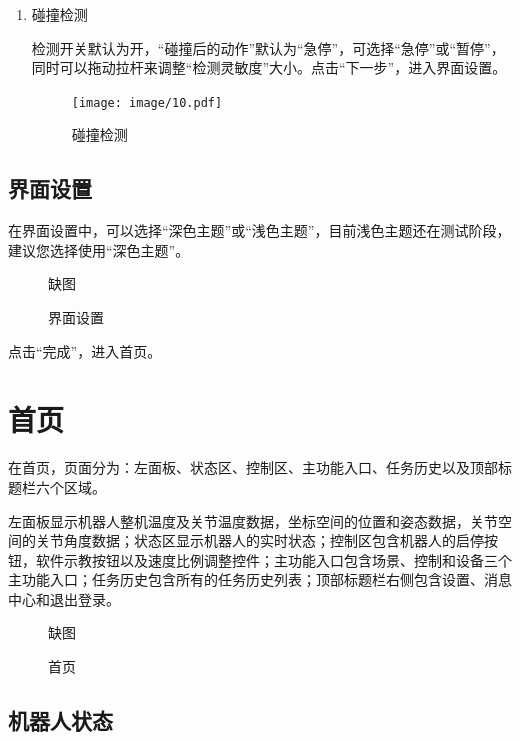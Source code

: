 \begin{enumerate}
\item 碰撞检测

	检测开关默认为开，“碰撞后的动作”默认为“急停”，可选择“急停”或“暂停”，同时可以拖动拉杆来调整“检测灵敏度”大小。点击“下一步”，进入界面设置。

	\begin{figure}[ht]
		\centering
		\texttt{[image: image/10.pdf]}
		\caption{碰撞检测}
		\label{fig:碰撞检测}
	\end{figure}


\end{enumerate}
	
\subsection{界面设置}

在界面设置中，可以选择“深色主题”或“浅色主题”，目前\LM 浅色主题还在测试阶段，建议您选择使用“深色主题”。

\begin{figure}[ht]
	\centering
	\color{red}缺图
	\caption{界面设置}
	\label{fig:界面设置}
\end{figure}

点击“完成”，进入\LM 首页。

\section{首页}

在\LM 首页，页面分为：左面板、状态区、控制区、主功能入口、任务历史以及顶部标题栏六个区域。

左面板显示机器人整机温度及关节温度数据，坐标空间的位置和姿态数据，关节空间的关节角度数据；状态区显示机器人的实时状态；控制区包含机器人的启停按钮，软件示教按钮以及速度比例调整控件；主功能入口包含场景、控制和设备三个主功能入口；任务历史包含所有的任务历史列表；顶部标题栏右侧包含设置、消息中心和退出登录。

\begin{figure}[ht]
	\centering
	\color{red}缺图
	\caption{\LM 首页}
	\label{fig:LM首页}
\end{figure}

\subsection{机器人状态}

